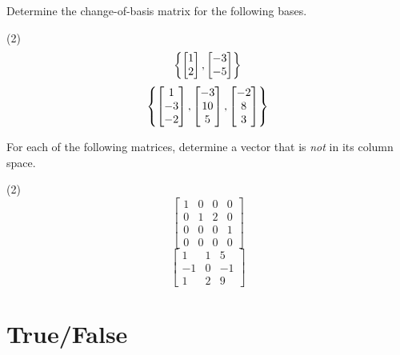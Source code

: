 Determine the change-of-basis matrix for the following bases.
\begin{tasks}[resume, style=enumerate](2)
\task
  \begin{displaymath}
    \left\{
     \begin{bmatrix} 1 \\ 2 \end{bmatrix} ,
     \begin{bmatrix} -3 \\ -5 \end{bmatrix} 
    \right\}
  \end{displaymath}
\task
\begin{displaymath}
\left\{
 \begin{bmatrix} 1 \\ -3 \\ -2 \end{bmatrix} ,
 \begin{bmatrix} -3 \\ 10 \\ 5 \end{bmatrix} ,
 \begin{bmatrix} -2 \\ 8 \\ 3 \end{bmatrix} 
\right\}
\end{displaymath}
\end{tasks}
For each of the following matrices, determine a vector that is
\textit{not} in its column space.
\begin{tasks}[resume, style=enumerate](2)
\task
  \begin{displaymath}
    \begin{bmatrix}
      1 & 0 & 0 & 0 \\
      0 & 1 & 2 & 0 \\
      0 & 0 & 0 & 1 \\
      0 & 0 & 0 & 0
    \end{bmatrix}
  \end{displaymath}
\task
  \begin{displaymath}
    \begin{bmatrix}
      1 & 1 & 5 \\
      -1 & 0 & -1 \\
      1 & 2 & 9
    \end{bmatrix}
  \end{displaymath}
\end{tasks}

\section{True/False}

\trueFalseHeader

